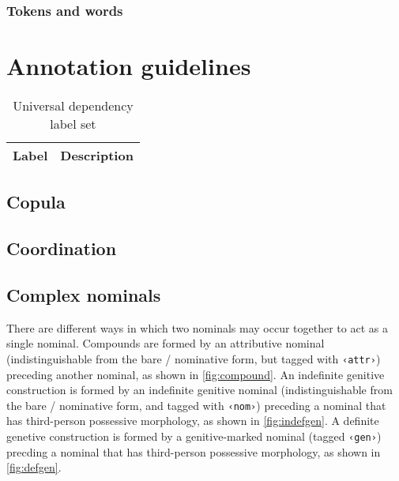 \documentclass[a4paper,11pt, onecolumn,twoside]{article}
\newcommand{\tag}[1]{\texttt{‹#1›}}
\begin{document}

\subsubsection{Tokens and words}


\section{Annotation guidelines}



\begin{table}[htbp]
  \centering
  \begin{tabular}{|l|l|}
    \hline
    \textbf{Label} & \textbf{Description} \\

    \hline
  \end{tabular}
  \caption{Universal dependency label set}
\end{table}

\subsection{Copula}

\subsection{Coordination}

\subsection{Complex nominals}


There are different ways in which two nominals may occur together to act as a single nominal.  Compounds are formed by an attributive nominal (indistinguishable from the bare / nominative form, but tagged with \tag{attr}) preceding another nominal, as shown in \ref{fig:compound}.  An indefinite genitive construction is formed by an indefinite genitive nominal (indistinguishable from the bare / nominative form, and tagged with \tag{nom}) preceding a nominal that has third-person possessive morphology, as shown in \ref{fig:indefgen}.  A definite genetive construction is formed by a genitive-marked nominal (tagged \tag{gen}) precding a nominal that has third-person possessive morphology, as shown in \ref{fig:defgen}.
\end{document}
